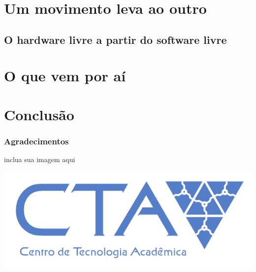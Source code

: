 \documentclass{beamer}
\begin{document}
\section{Um movimento leva ao outro}

\subsection{O hardware livre a partir do software livre}

\section{O que vem por aí}


\section{Conclusão}





\frame
{
    \frametitle{Agradecimentos}
    inclua sua imagem aqui

    \includegraphics[scale=0.55]{cta.png} 
}
\end{document}
